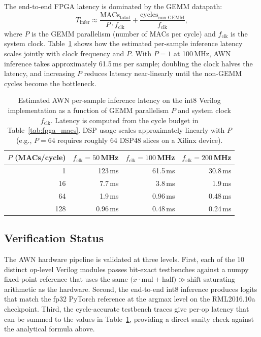 The end-to-end FPGA latency is dominated by the GEMM datapath:
\begin{equation}
  T_{\text{infer}} \approx \frac{\text{MACs}_{\text{total}}}
                              {P \cdot f_{\text{clk}}}
    + \frac{\text{cycles}_{\text{non-GEMM}}}{f_{\text{clk}}},
\end{equation}
where $P$ is the GEMM parallelism (number of MACs per cycle) and
$f_{\text{clk}}$ is the system clock. Table~\ref{tab:fpga_latency} shows
how the estimated per-sample inference latency scales jointly with clock
frequency and $P$. With $P = 1$ at 100\,MHz, AWN inference takes
approximately 61.5\,ms per sample; doubling the clock halves the latency,
and increasing $P$ reduces latency near-linearly until the non-GEMM
cycles become the bottleneck.

\begin{table}[!ht]
\caption{Estimated AWN per-sample inference latency on the int8 Verilog
  implementation as a function of GEMM parallelism $P$ and system clock
  $f_{\text{clk}}$. Latency is computed from the cycle budget in
  Table~\ref{tab:fpga_macs}. DSP usage scales approximately linearly with
  $P$ (e.g., $P = 64$ requires roughly 64 DSP48 slices on a Xilinx
  device).}
\label{tab:fpga_latency}
\centering
\small
\begin{tabular}{rrrr}
\toprule
$P$ (MACs/cycle) & $f_{\text{clk}} = 50$\,MHz & $f_{\text{clk}} = 100$\,MHz & $f_{\text{clk}} = 200$\,MHz \\
\midrule
1   & 123\,ms  & 61.5\,ms  & 30.8\,ms \\
16  & 7.7\,ms  & 3.8\,ms   & 1.9\,ms  \\
64  & 1.9\,ms  & 0.96\,ms  & 0.48\,ms \\
128 & 0.96\,ms & 0.48\,ms  & 0.24\,ms \\
\bottomrule
\end{tabular}
\end{table}

\subsection{Verification Status}

The AWN hardware pipeline is validated at three levels.
First, each of the 10 distinct op-level Verilog modules passes bit-exact
testbenches against a numpy fixed-point reference that uses the same
$\bigl(x \cdot \text{mul} + \text{half}\bigr) \gg \text{shift}$ saturating
arithmetic as the hardware.
Second, the end-to-end int8 inference produces logits that match the
fp32 PyTorch reference at the argmax level on the RML2016.10a checkpoint.
Third, the cycle-accurate testbench traces give per-op latency that can be
summed to the values in Table~\ref{tab:fpga_latency}, providing a direct
sanity check against the analytical formula above.

